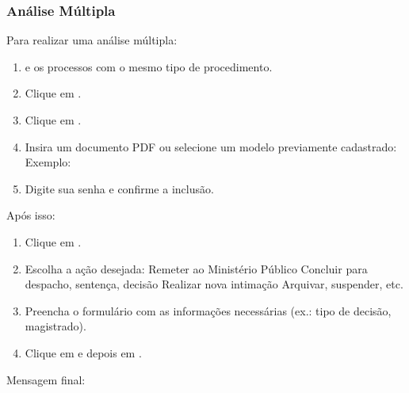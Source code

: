 \documentclass[letterpaper,10pt,brazil]{sphinxmanual}
\begin{document}
\subsubsection{Análise Múltipla}
\label{\detokenize{projud_04_analisemultipla:analise-multipla}}
\sphinxAtStartPar
Para realizar uma análise múltipla:
\begin{enumerate}
%
\item {} 
\sphinxAtStartPar
{} e  os processos com o mesmo tipo de procedimento.

\item {} 
\sphinxAtStartPar
Clique em .

\item {} 
\sphinxAtStartPar
Clique em .

\item {} 
\sphinxAtStartPar
Insira um documento PDF ou selecione um modelo previamente cadastrado:
\sphinxhyphen{} Exemplo: 

\item {} 
\sphinxAtStartPar
Digite sua senha e confirme a inclusão.

\end{enumerate}

\sphinxAtStartPar
Após isso:
\begin{enumerate}
%
\item {} 
\sphinxAtStartPar
Clique em .

\item {} 
\sphinxAtStartPar
Escolha a ação desejada:
\sphinxhyphen{} Remeter ao Ministério Público
\sphinxhyphen{} Concluir para despacho, sentença, decisão
\sphinxhyphen{} Realizar nova intimação
\sphinxhyphen{} Arquivar, suspender, etc.

\item {} 
\sphinxAtStartPar
Preencha o formulário com as informações necessárias (ex.: tipo de decisão, magistrado).

\item {} 
\sphinxAtStartPar
Clique em  e depois em .

\end{enumerate}

\sphinxAtStartPar
Mensagem final: 
\end{document}

